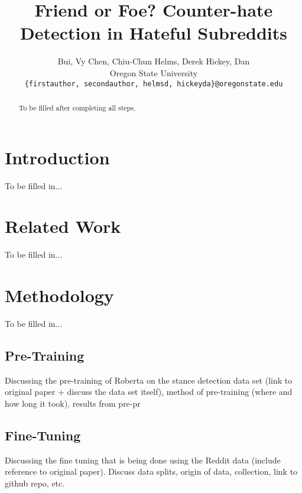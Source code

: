 \documentclass[10pt,twocolumn,letterpaper]{article}
\begin{document}
\title{Friend or Foe? Counter-hate Detection in Hateful Subreddits}

\author{Bui, Vy \hspace{20pt} Chen, Chiu-Chun \hspace{20 pt} Helms, Derek \hspace{20 pt} Hickey, Dan \\
Oregon State University\\
{\tt\small \{firstauthor, secondauthor, helmsd, hickeyda\}@oregonstate.edu}
}
\maketitle

\begin{abstract}
   To be filled after completing all steps.
\end{abstract}

\section{Introduction}
To be filled in...

\section{Related Work}
To be filled in...

\section{Methodology}
To be filled in...

\subsection{Pre-Training}
Discussing the pre-training of Roberta on the stance detection data set (link to original paper + discuss the data set itself), method of pre-training (where and how long it took), results from pre-pr

\subsection{Fine-Tuning}
Discussing the fine tuning that is being done using the Reddit data (include reference to original paper). Discuss data splits, origin of data, collection, link to github repo, etc.
\end{document}
